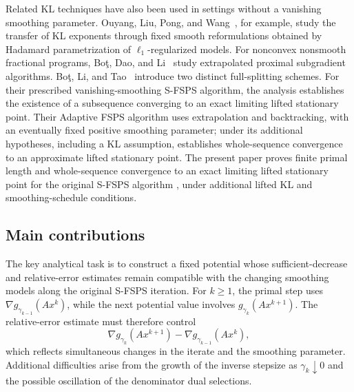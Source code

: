 \documentclass[9pt]{article}
\numberwithin{equation}{section}
\theoremstyle{definition}
\theoremstyle{remark}
\begin{document}
Related KL techniques have also been used in settings without a
vanishing smoothing parameter. Ouyang, Liu, Pong, and
Wang~\cite{OuyangLiuPongWang2025}, for example, study the transfer of
KL exponents through fixed smooth reformulations obtained by Hadamard
parametrization of $\ell_1$-regularized models. For nonconvex nonsmooth
fractional programs, Bo\c{t}, Dao, and Li~\cite{BotDaoLi2022} study
extrapolated proximal subgradient algorithms. Bo\c{t}, Li, and
Tao~\cite{BotLiTao2025} introduce two distinct full-splitting schemes.
For their prescribed vanishing-smoothing S-FSPS algorithm, the analysis
establishes the existence of a subsequence converging to an
exact limiting lifted stationary point. Their Adaptive FSPS algorithm uses extrapolation
and backtracking, with an eventually fixed positive smoothing parameter;
under its additional hypotheses, including a KL assumption,
\cite[Theorem~6.11]{BotLiTao2025} establishes whole-sequence convergence
to an approximate lifted stationary point. The present paper proves
finite primal length and whole-sequence convergence to an exact
limiting lifted stationary point for the original S-FSPS algorithm
\cite[Algorithm~4.1]{BotLiTao2025}, under additional lifted KL and
smoothing-schedule conditions.

\subsection{Main contributions}

The key analytical task is to construct a fixed potential whose
sufficient-decrease and relative-error estimates remain compatible
with the changing smoothing models along the original S-FSPS
iteration. For $k\geq1$, the primal step uses
$\nabla g_{\gamma_{k-1}}(Ax^k)$, while the next potential value
involves $g_{\gamma_k}(Ax^{k+1})$. The relative-error estimate
must therefore control
\[
 \nabla g_{\gamma_k}(Ax^{k+1})
 -\nabla g_{\gamma_{k-1}}(Ax^k),
\]
which reflects simultaneous changes in the iterate and the
smoothing parameter. Additional difficulties arise from the
growth of the inverse stepsize as $\gamma_k\downarrow0$ and
the possible oscillation of the denominator dual selections.
\end{document}
